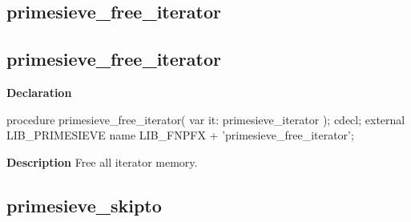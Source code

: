 \documentclass{report}
\newif\ifpdf
\begin{document}
\subsection*{\large{\textbf{primesieve{\_}free{\_}iterator}}\normalsize\hspace{1ex}\hrulefill}
\else
\subsection*{primesieve{\_}free{\_}iterator}
\fi
\label{primesieve-primesieve_free_iterator}
\begin{list}{}{
\setlength{\itemindent}{0cm}
\setlength{\listparindent}{0cm}
\setlength{\leftmargin}{\evensidemargin}
\addtolength{\leftmargin}{\tmplength}
\settowidth{\labelsep}{X}
\addtolength{\leftmargin}{\labelsep}
\setlength{\labelwidth}{\tmplength}
}
\item[\textbf{Declaration}\hfill]
\ifpdf
\begin{flushleft}
\fi
\begin{ttfamily}
procedure primesieve{\_}free{\_}iterator( var it: primesieve{\_}iterator ); cdecl; external LIB{\_}PRIMESIEVE name LIB{\_}FNPFX + 'primesieve{\_}free{\_}iterator';\end{ttfamily}

\ifpdf
\end{flushleft}
\fi

\par
\item[\textbf{Description}]
Free all iterator memory.

\end{list}
\ifpdf
\subsection*{\large{\textbf{primesieve{\_}skipto}}\normalsize\hspace{1ex}\hrulefill}
\else
\end{document}
